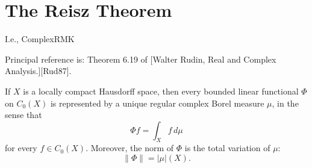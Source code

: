 \chapter{The Reisz Theorem}

I.e., ComplexRMK

Principal reference is: Theorem 6.19 of [Walter Rudin, Real and Complex Analysis.][Rud87].



\begin{theorem}[Rudin 6.19]
  If $X$ is a locally compact Hausdorff space, then every bounded linear functional $\Phi$ on $C_0(X)$ is represented by a unique regular complex Borel measure $\mu$, in the sense that
  \begin{equation}
  \Phi f = \int_X f \, d\mu \tag{1}
  \end{equation}
  for every $f \in C_0(X)$. Moreover, the norm of $\Phi$ is the total variation of $\mu$:
  \begin{equation}
  \|\Phi\| = |\mu|(X). \tag{2}
  \end{equation}
\end{theorem}

